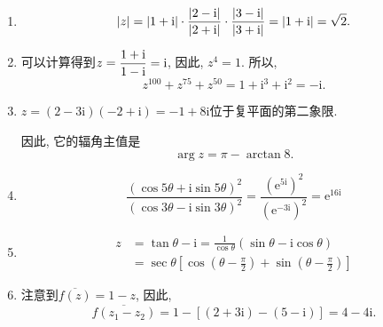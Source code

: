 \begin{yySolution}
	\begin{enumerate}
		\item \begin{equation*}
			\lvert z\rvert = \lvert1+\mathrm{i}\rvert\cdot\frac{\lvert2-\mathrm{i}\rvert}{\lvert2+\mathrm{i}\rvert}\cdot\frac{\lvert3-\mathrm{i}\rvert}{\lvert3+\mathrm{i}\rvert} = \lvert1+\mathrm{i}\rvert = \sqrt{2}.
		\end{equation*}
		\item 可以计算得到$z =\begin{lgathered}\frac{1+\mathrm{i}}{1-\mathrm{i}} = \mathrm{i}\end{lgathered}$, 因此, $z^4 = 1$.
		所以,\begin{equation*}
			z^{100}+z^{75}+z^{50} = 1 +\mathrm{i}^3 +\mathrm{i}^2 = -\mathrm{i}.
		\end{equation*}
		\item $z = (2-3\mathrm{i})(-2+\mathrm{i}) = -1+8\mathrm{i}$位于复平面的第二象限.
		
		因此, 它的辐角主值是\begin{equation*}
				\arg z = \pi - \arctan 8.
		\end{equation*}
		\item \begin{equation*}
			\frac{(\cos 5\theta + \mathrm{i}\sin 5\theta)^2}{(\cos 3\theta - \mathrm{i}\sin 3\theta)^2} = \frac{(\mathrm{e}^{5\mathrm{i}})^2}{(\mathrm{e}^{-3\mathrm{i}})^2} = \mathrm{e}^{16\mathrm{i}}
		\end{equation*}
		\item \begin{equation*}
			\begin{split}
				z &= \tan\theta - \mathrm{i} = \frac{1}{\cos\theta}\left( \sin\theta - \mathrm{i}\cos\theta \right) \\
				&= \sec\theta \left[\cos(\theta-\frac{\pi}{2})+\sin(\theta-\frac{\pi}{2})   \right]
			\end{split}
		\end{equation*}
		\item 注意到$\overline{f(z)} = 1-z$, 因此,\begin{equation*}
			\overline{f(z_1-z_2)} = 1-[(2+3\mathrm{i})-(5-\mathrm{i})] = 4-4\mathrm{i}.
		\end{equation*}
	\end{enumerate}
\end{yySolution}



